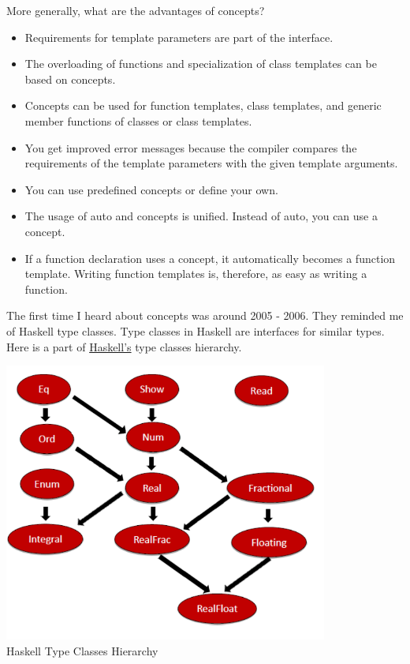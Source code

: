 More generally, what are the advantages of concepts?


\begin{itemize}
\item 
Requirements for template parameters are part of the interface.

\item 
The overloading of functions and specialization of class templates can be based on concepts.

\item 
Concepts can be used for function templates, class templates, and generic member functions of classes or class templates.

\item 
You get improved error messages because the compiler compares the requirements of the template parameters with the given template arguments.

\item 
You can use predefined concepts or define your own.

\item 
The usage of auto and concepts is unified. Instead of auto, you can use a concept.

\item 
If a function declaration uses a concept, it automatically becomes a function template. Writing function templates is, therefore, as easy as writing a function.
\end{itemize}



The first time I heard about concepts was around 2005 - 2006. They reminded me of Haskell type classes. Type classes in Haskell are interfaces for similar types. Here is a part of \href{https://en.wikipedia.org/wiki/Haskell_(programming_language)}{Haskell’s} type classes hierarchy.

\begin{center}
\includegraphics[width=0.8\textwidth]{content/3/chapter4/images/7.png}\\
Haskell Type Classes Hierarchy
\end{center}

